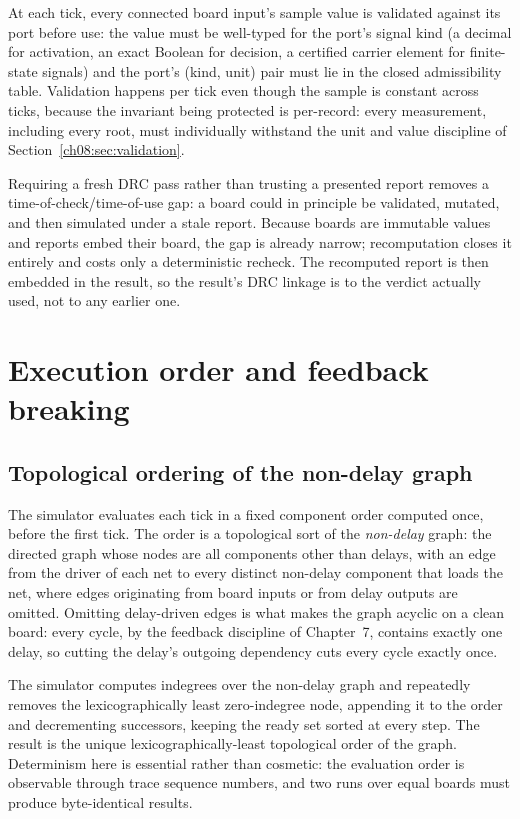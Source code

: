 At each tick, every connected board input's sample value is validated against its port before use: the value must be well-typed for the port's signal kind (a decimal for activation, an exact Boolean for decision, a certified carrier element for finite-state signals) and the port's (kind, unit) pair must lie in the closed admissibility table. Validation happens per tick even though the sample is constant across ticks, because the invariant being protected is per-record: every measurement, including every root, must individually withstand the unit and value discipline of Section~\ref{ch08:sec:validation}.

\begin{remark}\label{ch08:rem:rerun}
Requiring a fresh DRC pass rather than trusting a presented report removes a time-of-check/time-of-use gap: a board could in principle be validated, mutated, and then simulated under a stale report. Because boards are immutable values and reports embed their board, the gap is already narrow; recomputation closes it entirely and costs only a deterministic recheck. The recomputed report is then embedded in the result, so the result's DRC linkage is to the verdict actually used, not to any earlier one.
\end{remark}

\section{Execution order and feedback breaking}\label{ch08:sec:order}

\subsection{Topological ordering of the non-delay graph}

The simulator evaluates each tick in a fixed component order computed once, before the first tick. The order is a topological sort of the \emph{non-delay} graph: the directed graph whose nodes are all components other than delays, with an edge from the driver of each net to every distinct non-delay component that loads the net, where edges originating from board inputs or from delay outputs are omitted. Omitting delay-driven edges is what makes the graph acyclic on a clean board: every cycle, by the feedback discipline of Chapter~7, contains exactly one delay, so cutting the delay's outgoing dependency cuts every cycle exactly once.

\begin{construction}\label{ch08:con:kahn}
The simulator computes indegrees over the non-delay graph and repeatedly removes the lexicographically least zero-indegree node, appending it to the order and decrementing successors, keeping the ready set sorted at every step. The result is the unique lexicographically-least topological order of the graph. Determinism here is essential rather than cosmetic: the evaluation order is observable through trace sequence numbers, and two runs over equal boards must produce byte-identical results.
\end{construction}

